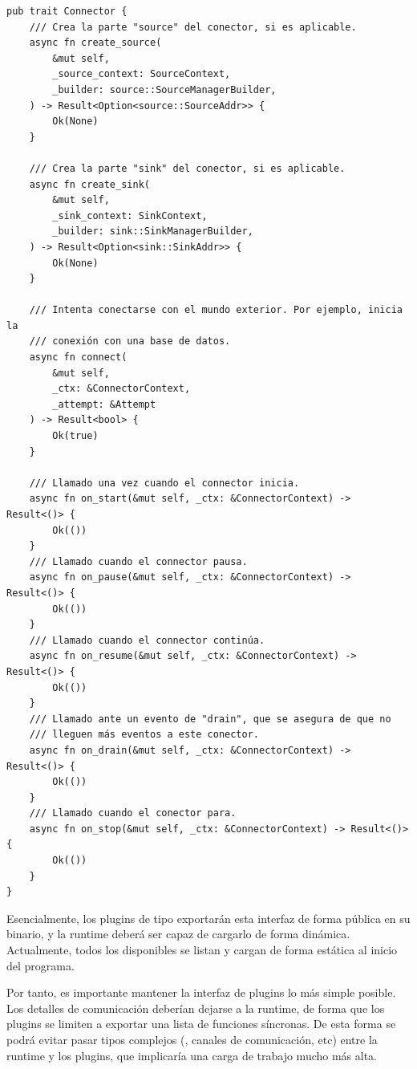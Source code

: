 \begin{verbatim}
pub trait Connector {
    /// Crea la parte "source" del conector, si es aplicable.
    async fn create_source(
        &mut self,
        _source_context: SourceContext,
        _builder: source::SourceManagerBuilder,
    ) -> Result<Option<source::SourceAddr>> {
        Ok(None)
    }

    /// Crea la parte "sink" del conector, si es aplicable.
    async fn create_sink(
        &mut self,
        _sink_context: SinkContext,
        _builder: sink::SinkManagerBuilder,
    ) -> Result<Option<sink::SinkAddr>> {
        Ok(None)
    }

    /// Intenta conectarse con el mundo exterior. Por ejemplo, inicia la
    /// conexión con una base de datos.
    async fn connect(
        &mut self,
        _ctx: &ConnectorContext,
        _attempt: &Attempt
    ) -> Result<bool> {
        Ok(true)
    }

    /// Llamado una vez cuando el connector inicia.
    async fn on_start(&mut self, _ctx: &ConnectorContext) -> Result<()> {
        Ok(())
    }
    /// Llamado cuando el connector pausa.
    async fn on_pause(&mut self, _ctx: &ConnectorContext) -> Result<()> {
        Ok(())
    }
    /// Llamado cuando el connector continúa.
    async fn on_resume(&mut self, _ctx: &ConnectorContext) -> Result<()> {
        Ok(())
    }
    /// Llamado ante un evento de "drain", que se asegura de que no
    /// lleguen más eventos a este conector.
    async fn on_drain(&mut self, _ctx: &ConnectorContext) -> Result<()> {
        Ok(())
    }
    /// Llamado cuando el conector para.
    async fn on_stop(&mut self, _ctx: &ConnectorContext) -> Result<()> {
        Ok(())
    }
}
\end{verbatim}

Esencialmente, los plugins de tipo \connector exportarán esta interfaz de forma
pública en su binario, y la runtime deberá ser capaz de cargarlo de forma
dinámica. Actualmente, todos los \connectors disponibles se listan y cargan de
forma estática al inicio del programa.

Por tanto, es importante mantener la interfaz de plugins lo más simple posible.
Los detalles de comunicación deberían dejarse a la runtime, de forma que los
plugins se limiten a exportar una lista de funciones síncronas. De esta forma se
podrá evitar pasar tipos complejos (, canales de comunicación, etc)
entre la runtime y los plugins, que implicaría una carga de trabajo mucho más
alta.

